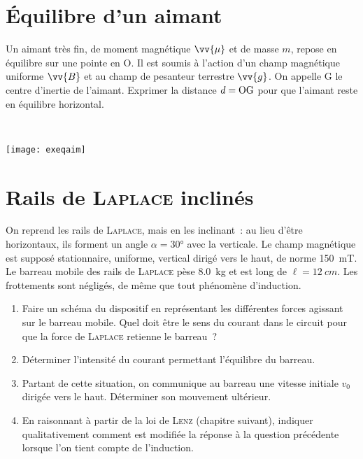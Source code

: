 \documentclass[a4paper, 10pt, final, garamond]{book}
\begin{document}
\section{Équilibre d'un aimant}
\label{sec:exeqaim}
\noindent
\begin{minipage}[t]{.7\linewidth}
  Un aimant très fin, de moment magnétique $\vv{\mu}$ et de masse $m$, repose en
  équilibre sur une pointe en O. Il est soumis à l'action d'un champ magnétique
  uniforme $\vv{B}$ et au champ de pesanteur terrestre $\vv{g}$. On appelle G le
  centre d'inertie de l'aimant.
  \smallbreak
  Exprimer la distance $d = \rm OG$ pour que l'aimant reste en équilibre
  horizontal.
\end{minipage}
\hfill
\begin{minipage}[t]{.3\linewidth}
  ~
  \vspace*{-20pt}
  \begin{center}
    \texttt{[image: exeqaim]}
    \label{fig:exeqaim}
  \end{center}
\end{minipage}

\section{Rails de \textsc{Laplace} inclinés}
\label{sec:railpl}
On reprend les rails de \textsc{Laplace}, mais en les inclinant~: au lieu d'être
horizontaux, ils forment un angle $\alpha = \ang{30;;}$ avec la verticale. Le
champ magnétique est supposé stationnaire, uniforme, vertical dirigé vers le
haut, de norme \SI{150}{mT}. Le barreau mobile des rails de \textsc{Laplace}
pèse \SI{8.0}{kg} et est long de $\ell = \SI{12}{cm}$. Les frottements sont
négligés, de même que tout phénomène d'induction.
\begin{enumerate}
  \item Faire un schéma du dispositif en représentant les différentes forces
    agissant sur le barreau mobile. Quel doit être le sens du courant dans le
    circuit pour que la force de \textsc{Laplace} retienne le barreau~?
  \item Déterminer l'intensité du courant permettant l'équilibre du barreau.
  \item Partant de cette situation, on communique au barreau une vitesse
    initiale $v_0$ dirigée vers le haut. Déterminer son mouvement ultérieur.
  \item En raisonnant à partir de la loi de \textsc{Lenz} (chapitre suivant),
    indiquer qualitativement comment est modifiée la réponse à la question
    précédente lorsque l'on tient compte de l'induction.
\end{enumerate}
\end{document}

